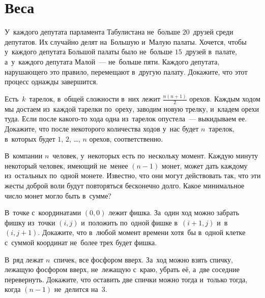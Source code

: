 
\section*{Веса}


\begin{problems}

\item
У~каждого депутата парламента Табулистана не~больше $20$~друзей среди
депутатов.
Их случайно делят на~Большую и~Малую палаты.
Хочется, чтобы у~каждого депутата Большой палаты было не~больше $15$~друзей
в~палате, а~у~каждого депутата Малой~--- не~больше пяти.
Каждого депутата, нарушающего это правило, перемещают в~другую палату.
Докажите, что этот процесс однажды завершится.

\item
Есть~$k$~тарелок, в~общей сложности в~них лежит $\frac{n (n + 1)}{2}$ орехов.
Каждым ходом мы достаем из~каждой тарелки по~ореху, заводим новую трелку,
и~кладем орехи туда.
Если после какого-то хода одна из~тарелок опустела~--- выкидываем ее.
Докажите, что после некоторого количества ходов у~нас будет $n$~тарелок,
в~которых будет $1$, $2$, \ldots, $n$ орехов, соответственно.

\item
В~компании $n$~человек, у~некоторых есть по~нескольку момент.
Каждую минуту некоторый человек, имеющий не~менее $(n - 1)$ монет, может дать
каждому из~остальных по~одной монете.
Известно, что они могут действовать так, что эти жесты доброй воли будут
повторяться бесконечно долго.
Какое минимальное число монет могло быть в~сумме?

\item
В~точке с~координатами $(0, 0)$ лежит фишка.
За~один ход можно забрать фишку из~точки $(i, j)$ и~положить по~одной фишке
в~$(i + 1, j)$ и~в~$(i, j + 1)$.
Докажите, что в~любой момент времени хотя~бы в~одной клетке с~суммой координат
не~более трех будет фишка.

\item
В~ряд лежат $n$~спичек, все фосфором вверх.
За~ход можно взять спичку, лежащую фосфором вверх, не~лежащую с~краю, убрать
её, а~две соседние перевернуть.
Докажите, что оставить две спички можно тогда и~только тогда, когда $(n - 1)$
не~делится на~$3$.

\end{problems}

